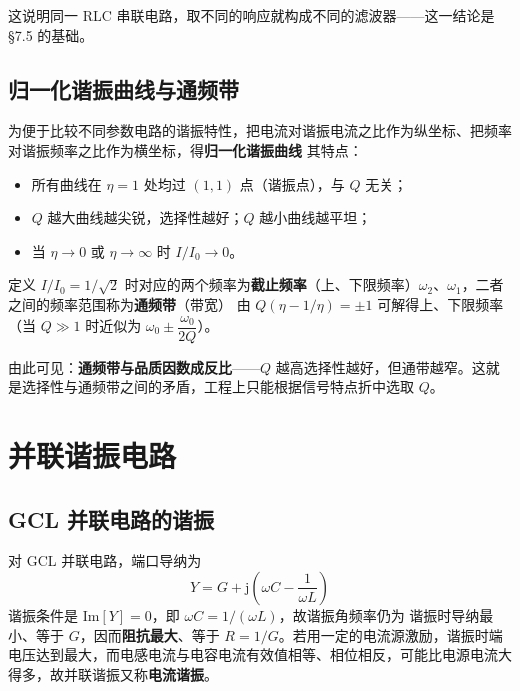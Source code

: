 这说明同一 RLC 串联电路，取不同的响应就构成不同的滤波器——这一结论是 §7.5 的基础。

\subsection{归一化谐振曲线与通频带}
为便于比较不同参数电路的谐振特性，把电流对谐振电流之比作为纵坐标、把频率对谐振频率之比作为横坐标，得\textbf{归一化谐振曲线}
其特点：
\begin{itemize}
  \item 所有曲线在 $\eta=1$ 处均过 $(1,1)$ 点（谐振点），与 $Q$ 无关；
  \item $Q$ 越大曲线越尖锐，选择性越好；$Q$ 越小曲线越平坦；
  \item 当 $\eta\to0$ 或 $\eta\to\infty$ 时 $I/I_0\to0$。
\end{itemize}

定义 $I/I_0=1/\sqrt{2}$ 时对应的两个频率为\textbf{截止频率}（上、下限频率）$\omega_2$、$\omega_1$，二者之间的频率范围称为\textbf{通频带}（带宽）
由 $Q\left(\eta-1/\eta\right)=\pm1$ 可解得上、下限频率（当 $Q\gg1$ 时近似为 $\omega_0\pm\dfrac{\omega_0}{2Q}$）。

由此可见：\textbf{通频带与品质因数成反比}——$Q$ 越高选择性越好，但通带越窄。这就是选择性与通频带之间的矛盾，工程上只能根据信号特点折中选取 $Q$。


\section{并联谐振电路}
\subsection{GCL 并联电路的谐振}
对 GCL 并联电路，端口导纳为
\begin{equation}
Y=G+\mathrm{j}\left(\omega C-\frac{1}{\omega L}\right)
\end{equation}
谐振条件是 $\mathrm{Im}[Y]=0$，即 $\omega C=1/(\omega L)$，故谐振角频率仍为
谐振时导纳最小、等于 $G$，因而\textbf{阻抗最大}、等于 $R=1/G$。若用一定的电流源激励，谐振时端电压达到最大，而电感电流与电容电流有效值相等、相位相反，可能比电源电流大得多，故并联谐振又称\textbf{电流谐振}。

